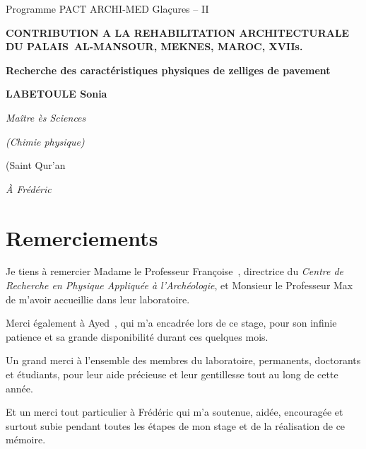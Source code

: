 
{\centering Programme PACT ARCHI-MED Glaçures -- II \par}

{\par}

{\centering \textbf{CONTRIBUTION A LA REHABILITATION ARCHITECTURALE DU PALAIS~AL-MANSOUR, MEKNES, MAROC, XVII\ieme s.} \par}


{\centering\bfseries Recherche des caractéristiques physiques de zelliges de pavement \par}

{\centering\bfseries LABETOULE Sonia \par}

{\centering\itshape Maître ès Sciences \par}

{\centering\itshape (Chimie physique) \par}

\clearpage

\begin{RaggedLeft}
  \itshape

  (Saint Qur'an
\end{RaggedLeft}


{\raggedleft\itshape À Frédéric \par}


\chapter*{Remerciements}

Je tiens à remercier Madame le Professeur Françoise~, 
directrice du \emph{Centre de Recherche en Physique Appliquée à 
l'Archéologie}, et Monsieur le Professeur Max~ 
de m'avoir accueillie dans leur laboratoire.

Merci également à Ayed~, qui m'a encadrée lors de ce 
stage, pour son infinie patience et sa grande disponibilité durant 
ces quelques mois.

Un grand merci à l'ensemble des membres du laboratoire, permanents, 
doctorants et étudiants, pour leur aide précieuse et leur gentillesse 
tout au long de cette année.

Et un merci tout particulier à Frédéric qui m'a soutenue, aidée, 
encouragée et surtout subie pendant toutes les étapes de mon stage 
et de la réalisation de ce mémoire.

